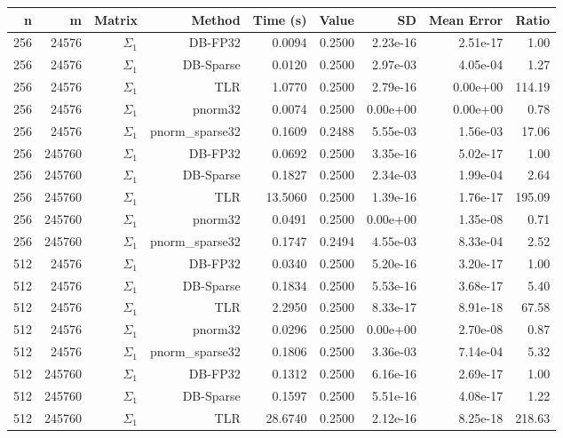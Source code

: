 \begin{tabular}{|r|r|r|r|r|r|r|r|r|}
  \hline
  \textbf{n} & \textbf{m} & \textbf{Matrix} & \textbf{Method} & \textbf{Time (s)} & \textbf{Value} & \textbf{SD} & \textbf{Mean Error} & \textbf{Ratio} \\
  \hline
  256 & 24576 & $\Sigma_1$ & DB-FP32 & 0.0094 & 0.2500 & 2.23e-16 & 2.51e-17 & 1.00 \\
  256 & 24576 & $\Sigma_1$ & DB-Sparse & 0.0120 & 0.2500 & 2.97e-03 & 4.05e-04 & 1.27 \\
  256 & 24576 & $\Sigma_1$ & TLR & 1.0770 & 0.2500 & 2.79e-16 & 0.00e+00 & 114.19 \\
  256 & 24576 & $\Sigma_1$ & pnorm32 & 0.0074 & 0.2500 & 0.00e+00 & 0.00e+00 & 0.78 \\
  256 & 24576 & $\Sigma_1$ & pnorm\_sparse32 & 0.1609 & 0.2488 & 5.55e-03 & 1.56e-03 & 17.06 \\
  256 & 245760 & $\Sigma_1$ & DB-FP32 & 0.0692 & 0.2500 & 3.35e-16 & 5.02e-17 & 1.00 \\
  256 & 245760 & $\Sigma_1$ & DB-Sparse & 0.1827 & 0.2500 & 2.34e-03 & 1.99e-04 & 2.64 \\
  256 & 245760 & $\Sigma_1$ & TLR & 13.5060 & 0.2500 & 1.39e-16 & 1.76e-17 & 195.09 \\
  256 & 245760 & $\Sigma_1$ & pnorm32 & 0.0491 & 0.2500 & 0.00e+00 & 1.35e-08 & 0.71 \\
  256 & 245760 & $\Sigma_1$ & pnorm\_sparse32 & 0.1747 & 0.2494 & 4.55e-03 & 8.33e-04 & 2.52 \\
  512 & 24576 & $\Sigma_1$ & DB-FP32 & 0.0340 & 0.2500 & 5.20e-16 & 3.20e-17 & 1.00 \\
  512 & 24576 & $\Sigma_1$ & DB-Sparse & 0.1834 & 0.2500 & 5.53e-16 & 3.68e-17 & 5.40 \\
  512 & 24576 & $\Sigma_1$ & TLR & 2.2950 & 0.2500 & 8.33e-17 & 8.91e-18 & 67.58 \\
  512 & 24576 & $\Sigma_1$ & pnorm32 & 0.0296 & 0.2500 & 0.00e+00 & 2.70e-08 & 0.87 \\
  512 & 24576 & $\Sigma_1$ & pnorm\_sparse32 & 0.1806 & 0.2500 & 3.36e-03 & 7.14e-04 & 5.32 \\
  512 & 245760 & $\Sigma_1$ & DB-FP32 & 0.1312 & 0.2500 & 6.16e-16 & 2.69e-17 & 1.00 \\
  512 & 245760 & $\Sigma_1$ & DB-Sparse & 0.1597 & 0.2500 & 5.51e-16 & 4.08e-17 & 1.22 \\
  512 & 245760 & $\Sigma_1$ & TLR & 28.6740 & 0.2500 & 2.12e-16 & 8.25e-18 & 218.63 \\

\end{tabular}
